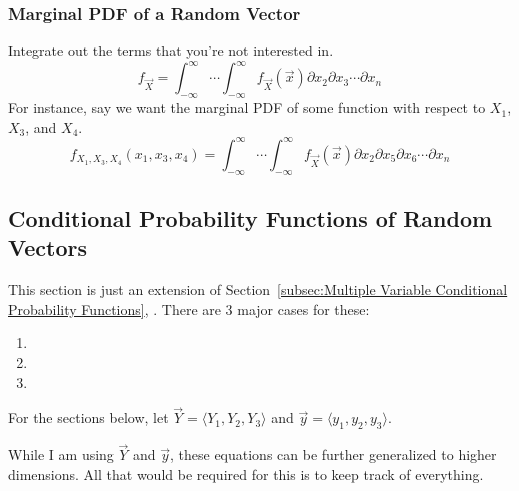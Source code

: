 		\subsubsection{Marginal PDF of a Random Vector} \label{subsubsec:Marginal PDF of Random Vector}
		Integrate out the terms that you're not interested in.
		\begin{equation} \label{eq:Marginal PDF of Random Vector}
			f_{\vec{X}} = \int_{-\infty}^{\infty} \cdots \int_{-\infty}^{\infty} f_{\vec{X}} \left( \vec{x} \right) \partial x_{2} \partial x_{3} \cdots \partial x_{n}
		\end{equation}
		For instance, say we want the marginal PDF of some function with respect to $X_{1}$, $X_{3}$, and $X_{4}$.
		\begin{equation} \label{eq:Marginal PDF of Random Vector Multiple Variables}
			f_{X_{1}, X_{3}, X_{4}} \left( x_{1}, x_{3}, x_{4} \right) = \int_{-\infty}^{\infty} \cdots \int_{-\infty}^{\infty} f_{\vec{X}} \left( \vec{x} \right) \partial x_{2} \partial x_{5} \partial x_{6} \cdots \partial x_{n}
		\end{equation}
	
	\subsection{Conditional Probability Functions of Random Vectors} \label{subsec:Random Vector Conditional Probability Functions}
	This section is just an extension of Section~\ref{subsec:Multiple Variable Conditional Probability Functions}, .
	There are 3 major cases for these:
		\begin{enumerate}
			\item {}
			\item {}
			\item {}
		\end{enumerate}
	
		\begin{remark*} \label{rmk:Define Random Vector Y for Example}
			\begin{large}
				For the sections below, let $\vec{Y}= \langle Y_{1},Y_{2},Y_{3} \rangle$ and $\vec{y}= \langle y_{1},y_{2},y_{3} \rangle$.
			\end{large} \newline
			While I am using $\vec{Y}$ and $\vec{y}$, these equations can be further generalized to higher dimensions.
			All that would be required for this is to keep track of everything.
		\end{remark*}
	
